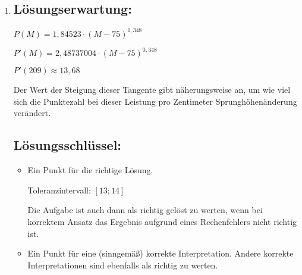 \begin{langesbeispiel}
{\begin{enumerate}
	$P=12,91\cdot (70,24-4)^{1,1}\approx 1\,300,64$\leer
	
	Eine mögliche Interpretation bon $b$:
	
	$b$ beschreibt die (Mindest-)Leistung (Wurfweite), die übertroffen werden muss, um Punkte zu erhalten.
		
	\subsection{Lösungsschlüssel:}
	\begin{itemize}
		\item Ein Ausgleichspunkt für die richtige Lösung.  
		
		Toleranzintervall: $[1\,300; 1\,301]$ 
		\item  Ein Punkt für eine (sinngemäß) korrekte Interpretation. Andere korrekte Interpretationen sind ebenfalls als richtig zu werten.
	\end{itemize}
	
	\item \subsection{Lösungserwartung:}
			
		$P(M)=1,84523\cdot (M-75)^{1,348}$
		
		$P'(M)=2,48737004\cdot (M-75)^{0,348}$
		
		$P'(209)\approx 13,68$\leer
		
		Der Wert der Steigung dieser Tangente gibt näherungsweise an, um wie viel sich die Punktezahl bei dieser Leistung pro Zentimeter Sprunghöhenänderung verändert.

	\subsection{Lösungsschlüssel:}
	
\begin{itemize}
	\item  Ein Punkt für die richtige Lösung.  
	
	Toleranzintervall: $[13; 14]$ 
	
	Die Aufgabe ist auch dann als richtig gelöst zu werten, wenn bei korrektem Ansatz das Ergebnis aufgrund eines Rechenfehlers nicht richtig ist. 
	\item Ein Punkt für eine (sinngemäß) korrekte Interpretation. Andere korrekte Interpretationen sind ebenfalls als richtig zu werten.
\end{itemize}


\end{enumerate}}
\end{langesbeispiel}
